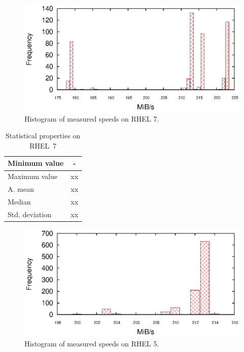 \begin{figure}[h!]
  \centering
 \includegraphics[width=12cm]{fig/tests/scattering_test.eps} %
\caption{Histogram of measured speeds on RHEL 7.}
\label{fig:testing:stability-r7}
\end{figure}

\begin{table}[h!]
\begin{center}
\begin{tabular}{|l|c|}
  \hline
  Minimum value& -\\
  \hline
  Maximum value& xx\\ 
  \hline
  A. mean & xx\\
  \hline
  Median & xx \\
  \hline
  Std. deviation & xx \\
  \hline
\end{tabular}
\caption{Statistical properties on RHEL~7}
\label{tab:testing:stability-stat-r7}
\end{center}
\end{table}
\begin{figure}[h!]
  \centering
 \includegraphics[width=12cm]{fig/tests/scattering_rhel5.eps} %
\caption{Histogram of measured speeds on RHEL 5.}
\label{fig:testing:stability-r5}
\end{figure}

